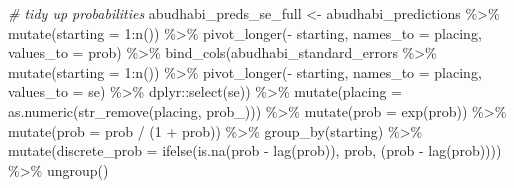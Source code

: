 \documentclass[
]{book}
\newenvironment{Shaded}{\begin{snugshade}}{\end{snugshade}}
\newcommand{\AttributeTok}[1]{\textcolor[rgb]{0.77,0.63,0.00}{#1}}
\newcommand{\CommentTok}[1]{\textcolor[rgb]{0.56,0.35,0.01}{\textit{#1}}}
\newcommand{\DecValTok}[1]{\textcolor[rgb]{0.00,0.00,0.81}{#1}}
\newcommand{\FunctionTok}[1]{\textcolor[rgb]{0.00,0.00,0.00}{#1}}
\newcommand{\NormalTok}[1]{#1}
\newcommand{\OtherTok}[1]{\textcolor[rgb]{0.56,0.35,0.01}{#1}}
\newcommand{\SpecialCharTok}[1]{\textcolor[rgb]{0.00,0.00,0.00}{#1}}
\newcommand{\StringTok}[1]{\textcolor[rgb]{0.31,0.60,0.02}{#1}}
\begin{document}
\begin{Shaded}
\begin{Highlighting}[]
\CommentTok{\# tidy up probabilities}
\NormalTok{abudhabi\_preds\_se\_full }\OtherTok{\textless{}{-}}\NormalTok{ abudhabi\_predictions }\SpecialCharTok{\%\textgreater{}\%}
  \FunctionTok{mutate}\NormalTok{(}\AttributeTok{starting =} \DecValTok{1}\SpecialCharTok{:}\FunctionTok{n}\NormalTok{()) }\SpecialCharTok{\%\textgreater{}\%}
  \FunctionTok{pivot\_longer}\NormalTok{(}\SpecialCharTok{{-}}\NormalTok{ starting, }\AttributeTok{names\_to =} \StringTok{\textquotesingle{}placing\textquotesingle{}}\NormalTok{, }\AttributeTok{values\_to =} \StringTok{\textquotesingle{}prob\textquotesingle{}}\NormalTok{) }\SpecialCharTok{\%\textgreater{}\%} 
  \FunctionTok{bind\_cols}\NormalTok{(abudhabi\_standard\_errors }\SpecialCharTok{\%\textgreater{}\%} \FunctionTok{mutate}\NormalTok{(}\AttributeTok{starting =} \DecValTok{1}\SpecialCharTok{:}\FunctionTok{n}\NormalTok{()) }\SpecialCharTok{\%\textgreater{}\%}
  \FunctionTok{pivot\_longer}\NormalTok{(}\SpecialCharTok{{-}}\NormalTok{ starting, }\AttributeTok{names\_to =} \StringTok{\textquotesingle{}placing\textquotesingle{}}\NormalTok{, }\AttributeTok{values\_to =} \StringTok{\textquotesingle{}se\textquotesingle{}}\NormalTok{) }\SpecialCharTok{\%\textgreater{}\%}
\NormalTok{    dplyr}\SpecialCharTok{::}\FunctionTok{select}\NormalTok{(se)) }\SpecialCharTok{\%\textgreater{}\%}
  \FunctionTok{mutate}\NormalTok{(}\AttributeTok{placing =} \FunctionTok{as.numeric}\NormalTok{(}\FunctionTok{str\_remove}\NormalTok{(placing, }\StringTok{\textquotesingle{}prob\_\textquotesingle{}}\NormalTok{))) }\SpecialCharTok{\%\textgreater{}\%}
  \FunctionTok{mutate}\NormalTok{(}\AttributeTok{prob =} \FunctionTok{exp}\NormalTok{(prob)) }\SpecialCharTok{\%\textgreater{}\%}
  \FunctionTok{mutate}\NormalTok{(}\AttributeTok{prob =}\NormalTok{ prob }\SpecialCharTok{/}\NormalTok{ (}\DecValTok{1} \SpecialCharTok{+}\NormalTok{ prob)) }\SpecialCharTok{\%\textgreater{}\%}
  \FunctionTok{group\_by}\NormalTok{(starting) }\SpecialCharTok{\%\textgreater{}\%} 
  \FunctionTok{mutate}\NormalTok{(}\AttributeTok{discrete\_prob =} \FunctionTok{ifelse}\NormalTok{(}\FunctionTok{is.na}\NormalTok{(prob }\SpecialCharTok{{-}} \FunctionTok{lag}\NormalTok{(prob)), prob, (prob }\SpecialCharTok{{-}} \FunctionTok{lag}\NormalTok{(prob)))) }\SpecialCharTok{\%\textgreater{}\%}
  \FunctionTok{ungroup}\NormalTok{()}


\end{Highlighting}
\end{Shaded}
\end{document}
